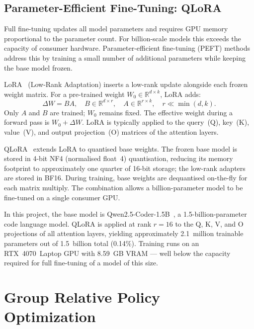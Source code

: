 \subsection{Parameter-Efficient Fine-Tuning: QLoRA}
\label{sec:qlora}

Full fine-tuning updates all model parameters and requires GPU memory proportional
to the parameter count.
For billion-scale models this exceeds the capacity of consumer hardware.
Parameter-efficient fine-tuning (PEFT) methods address this by training a small
number of additional parameters while keeping the base model frozen.

LoRA~\cite{lora} (Low-Rank Adaptation) inserts a low-rank update alongside each
frozen weight matrix.
For a pre-trained weight $W_0 \in \mathbb{R}^{d \times k}$, LoRA adds:
\begin{equation}
  \Delta W = B A, \quad
  B \in \mathbb{R}^{d \times r},\quad
  A \in \mathbb{R}^{r \times k},\quad
  r \ll \min(d, k).
\end{equation}
Only $A$ and $B$ are trained; $W_0$ remains fixed.
The effective weight during a forward pass is $W_0 + \Delta W$.
LoRA is typically applied to the query~(Q), key~(K), value~(V), and output
projection~(O) matrices of the attention layers.

QLoRA~\cite{qlora} extends LoRA to quantised base weights.
The frozen base model is stored in 4-bit NF4 (normalised float~4) quantisation,
reducing its memory footprint to approximately one quarter of 16-bit storage;
the low-rank adapters are stored in BF16.
During training, base weights are dequantised on-the-fly for each matrix multiply.
The combination allows a billion-parameter model to be fine-tuned on a single
consumer GPU.

In this project, the base model is Qwen2.5-Coder-1.5B~\cite{qwen25coder}, a
1.5-billion-parameter code language model.
QLoRA is applied at rank $r = 16$ to the Q, K, V, and O projections of all
attention layers, yielding approximately 2.1~million trainable parameters out of
1.5~billion total (0.14\%).
Training runs on an RTX~4070~Laptop GPU with 8.59~GB VRAM --- well below the
capacity required for full fine-tuning of a model of this size.

\section{Group Relative Policy Optimization}
\label{sec:grpo}

